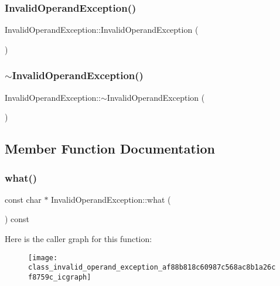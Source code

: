 \subsubsection{\texorpdfstring{InvalidOperandException()}{InvalidOperandException()}}
{\footnotesize\ttfamily Invalid\+Operand\+Exception\+::\+Invalid\+Operand\+Exception (\begin{DoxyParamCaption}{ }\end{DoxyParamCaption})}

\mbox{\label{class_invalid_operand_exception_aa687819eb27ede19044f1e6367ccb2aa}} 
\subsubsection{\texorpdfstring{$\sim$InvalidOperandException()}{~InvalidOperandException()}}
{\footnotesize\ttfamily Invalid\+Operand\+Exception\+::$\sim$\+Invalid\+Operand\+Exception (\begin{DoxyParamCaption}{ }\end{DoxyParamCaption})}



\subsection{Member Function Documentation}
\mbox{\label{class_invalid_operand_exception_af88b818c60987c568ac8b1a26cf8759c}} 
\subsubsection{\texorpdfstring{what()}{what()}}
{\footnotesize\ttfamily const char $\ast$ Invalid\+Operand\+Exception\+::what (\begin{DoxyParamCaption}{ }\end{DoxyParamCaption}) const\hspace{0.3cm}{\ttfamily [noexcept]}}

Here is the caller graph for this function\+:
\nopagebreak
\begin{figure}[H]
\begin{center}
\leavevmode
\texttt{[image: class\_invalid\_operand\_exception\_af88b818c60987c568ac8b1a26cf8759c\_icgraph]}
\end{center}
\end{figure}


